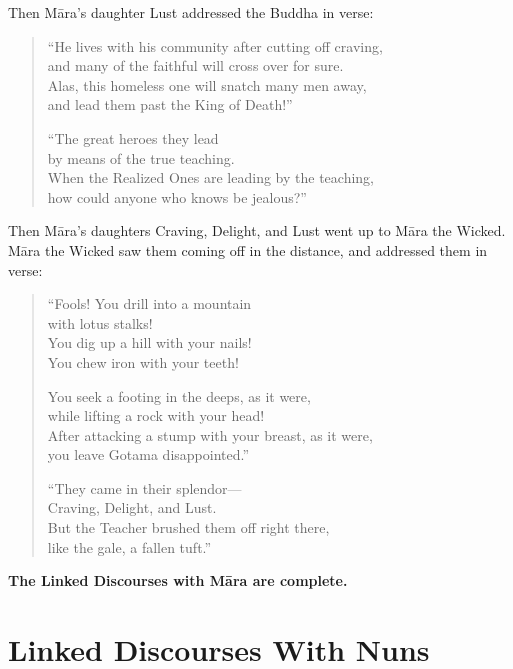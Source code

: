 \documentclass[12pt,openany]{book}%
\let\oldcontentsline\contentsline
\newcommand{\nopagecontentsline}[3]{\oldcontentsline{#1}{#2}{}}
\newcommand*{\scendkanda}[1]{\begin{Center}\textbf{#1}\end{Center}\addvspace{1em}} %
\begin{document}
Then \textsanskrit{Māra}’s daughter Lust addressed the Buddha in verse: 

\begin{verse}%
“He lives with his community after cutting off craving, \\
and many of the faithful will cross over for sure. \\
Alas, this homeless one will snatch many men away, \\
and lead them past the King of Death!” 

“The great heroes they lead \\
by means of the true teaching. \\
When the Realized Ones are leading by the teaching, \\
how could anyone who knows be jealous?” 

%
\end{verse}

Then \textsanskrit{Māra}’s daughters Craving, Delight, and Lust went up to \textsanskrit{Māra} the Wicked. \textsanskrit{Māra} the Wicked saw them coming off in the distance, and addressed them in verse: 

\begin{verse}%
“Fools! You drill into a mountain \\
with lotus stalks! \\
You dig up a hill with your nails! \\
You chew iron with your teeth! 

You seek a footing in the deeps, as it were, \\
while lifting a rock with your head! \\
After attacking a stump with your breast, as it were, \\
you leave Gotama disappointed.” 

“They came in their splendor—\\
Craving, Delight, and Lust. \\
But the Teacher brushed them off right there, \\
like the gale, a fallen tuft.” 

%
\end{verse}

\scendkanda{The Linked Discourses with \textsanskrit{Māra} are complete. }

%
\part*{Linked Discourses With Nuns }
\markboth{}{}
\addtocontents{toc}{\let\protect\contentsline\protect\oldcontentsline}
\end{document}
